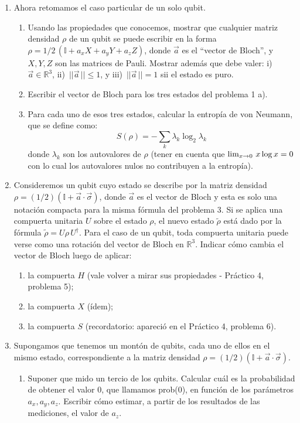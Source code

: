 \documentclass[a4paper,11pt,spanish]{article}
\begin{document}
\begin{enumerate}
\item Ahora retomamos el caso particular de un solo qubit.
\begin{enumerate}
 \item Usando las propiedades que conocemos, mostrar que cualquier matriz densidad $\rho$ de un qubit se
puede escribir en la forma 
$\rho = 1/2\, (\mathbb{I} + a_x X + a_y Y + a_z Z)$, donde $\vec a$ es el
``vector de Bloch'', y $X, Y, Z$ son las matrices de Pauli. Mostrar además que debe valer: i) $\vec a \in \mathbb{R}^3$, ii)~$||\vec a\,|| \leq 1$, y iii)~$||\vec a\,|| = 1$ sii el estado es puro.
\item Escribir el vector de Bloch para los tres estados del problema 1 a).
 \item Para cada uno de esos tres estados, calcular la entrop\'ia de von Neumann, que se define como:
 $$S(\rho) = -\sum_k \lambda_k \log_2 \lambda_k$$
 donde $\lambda_k$ son los autovalores de $\rho$ (tener en cuenta que ${\rm lim}_{x\to0}~x \log x=0$ con lo cual los autovalores nulos no contribuyen a la entrop\'ia).
\end{enumerate}

\item Consideremos un qubit cuyo estado se describe por la matriz densidad $\rho= (1/2)(\mathbb{I} + \vec a \cdot \vec \sigma)$, donde $\vec a$ es el vector de Bloch y esta es solo una notación compacta para la misma fórmula del problema 3. Si se aplica una compuerta unitaria $U$ sobre el estado $\rho$, el nuevo estado $\tilde \rho$ est\'a dado por la f\'ormula $\tilde \rho = U \rho\, U^\dagger$. Para el caso de un qubit, toda compuerta unitaria puede verse como una rotación del vector de Bloch en $\mathbb{R}^3$. Indicar cómo cambia el vector de Bloch luego de aplicar:
    
\begin{enumerate}
     \item la compuerta $H$ (vale volver a mirar sus propiedades - Práctico 4, problema 5);
     \item la compuerta $X$ (ídem);
     \item la compuerta $S$ (recordatorio: apareció en el Pr\'actico 4, problema 6).
\end{enumerate}

\item Supongamos que tenemos un montón de qubits, cada uno de ellos en el mismo estado, correspondiente a la matriz densidad $\rho= (1/2)(\mathbb{I} + \vec a \cdot \vec \sigma)$.
    
    \begin{enumerate}
     \item Suponer que mido un tercio de los qubits. Calcular cu\'al es la probabilidad de obtener el valor 0, que llamamos prob(0), en funci\'on de los par\'ametros $a_x, a_y, a_z$. Escribir c\'omo estimar, a partir de los resultados de las mediciones, el valor de $a_z$.
     

\end{enumerate}
\end{enumerate}
\end{document}
